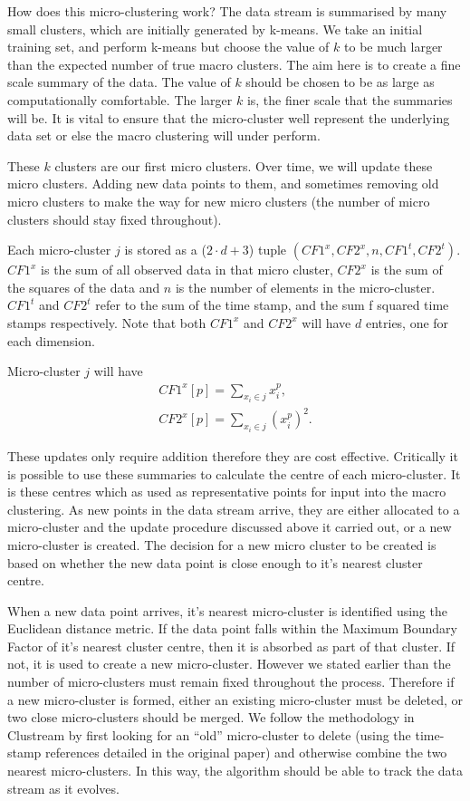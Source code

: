 \documentclass[12pt]{report}		%
\begin{document}
How does this micro-clustering work? The data stream is summarised by many small clusters, which are initially generated by k-means. We take an initial training set, and perform k-means but choose the value of $k$ to be much larger than the expected number of true macro clusters. The aim here is to create a fine scale summary of the data. The value of $k$ should be chosen to be as large as computationally comfortable. The larger $k$ is, the finer scale that the summaries will be. It is vital to ensure that the micro-cluster well represent the underlying data set or else the macro clustering will under perform. 

These $k$ clusters are our first micro clusters. Over time, we will update these micro clusters. Adding new data points to them, and sometimes removing old micro clusters to make the way for new micro clusters (the number of micro clusters should stay fixed throughout). 

Each micro-cluster $j$ is stored as a ($2 \cdot d + 3$) tuple $(CF1^x, CF2^x, n, CF1^t, CF2^t)$. $CF1^x$ is the sum of all observed data in that micro cluster, $CF2^x$ is the sum of the squares of the data and $n$ is the number of elements in the micro-cluster. $CF1^t$ and $CF2^t$ refer to the sum of the time stamp, and the sum f squared time stamps respectively. 
Note that both $CF1^x$ and $CF2^x$ will have $d$ entries, one for each dimension.

Micro-cluster $j$ will have 
\begin{align*}
CF1^x[p] = \sum_{x_i \in j}{x_i^p},   \\
CF2^x[p] = \sum_{x_i \in j}{(x_i^p)^2}.
\end{align*}

These updates only require addition therefore they are cost effective. Critically it is possible to use these summaries to calculate the centre of each micro-cluster. It is these centres which as used as representative points for input into the macro clustering.  As new points in the data stream arrive, they are either allocated to a micro-cluster and the update procedure discussed above it carried out, or a new micro-cluster is created. The decision for a new micro cluster to be created is based on whether the new data point is close enough to it's nearest cluster centre. 

When a new data point arrives, it's nearest micro-cluster is identified using the Euclidean distance metric. If the data point falls within the Maximum Boundary Factor of it's nearest cluster centre, then it is absorbed as part of that cluster. If not, it is used to create a new micro-cluster. However we stated earlier than the number of micro-clusters must remain fixed throughout the process. Therefore if a new micro-cluster is formed, either an existing  micro-cluster must be deleted, or two close micro-clusters should be merged. We follow the methodology in Clustream by first looking for an ``old'' micro-cluster to delete (using the time-stamp references detailed in the original paper) and otherwise combine the two nearest micro-clusters. In this way, the algorithm should be able to track the data stream as it evolves. 
\end{document}
